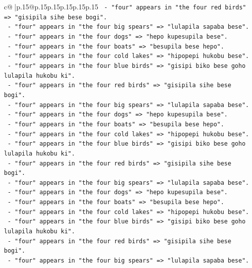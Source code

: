 \documentclass{article}
\begin{document}
{\begin{supertabular}{c@{$\;$}|p{.15\linewidth}@{}p{.15\linewidth}p{.15\linewidth}p{.15\linewidth}p{.15\linewidth}p{.15\linewidth}}
{{{\texttt{           {-} "four" appears in "the four red birds" => "gisipila sihe bese bogi".} \\
\texttt{           {-} "four" appears in "the four big spears" => "lulapila sapaba bese".} \\
\texttt{           {-} "four" appears in "the four dogs" => "hepo kupesupila bese".} \\
\texttt{           {-} "four" appears in "the four boats" => "besupila bese hepo".} \\
\texttt{           {-} "four" appears in "the four cold lakes" => "hipopepi hukobu bese".} \\
\texttt{           {-} "four" appears in "the four blue birds" => "gisipi biko bese goho lulapila hukobu ki".} \\
\texttt{           {-} "four" appears in "the four red birds" => "gisipila sihe bese bogi".} \\
\texttt{           {-} "four" appears in "the four big spears" => "lulapila sapaba bese".} \\
\texttt{           {-} "four" appears in "the four dogs" => "hepo kupesupila bese".} \\
\texttt{           {-} "four" appears in "the four boats" => "besupila bese hepo".} \\
\texttt{           {-} "four" appears in "the four cold lakes" => "hipopepi hukobu bese".} \\
\texttt{           {-} "four" appears in "the four blue birds" => "gisipi biko bese goho lulapila hukobu ki".} \\
\texttt{           {-} "four" appears in "the four red birds" => "gisipila sihe bese bogi".} \\
\texttt{           {-} "four" appears in "the four big spears" => "lulapila sapaba bese".} \\
\texttt{           {-} "four" appears in "the four dogs" => "hepo kupesupila bese".} \\
\texttt{           {-} "four" appears in "the four boats" => "besupila bese hepo".} \\
\texttt{           {-} "four" appears in "the four cold lakes" => "hipopepi hukobu bese".} \\
\texttt{           {-} "four" appears in "the four blue birds" => "gisipi biko bese goho lulapila hukobu ki".} \\
\texttt{           {-} "four" appears in "the four red birds" => "gisipila sihe bese bogi".} \\
\texttt{           {-} "four" appears in "the four big spears" => "lulapila sapaba bese".} \\
}}}
\end{supertabular}}
\end{document}
